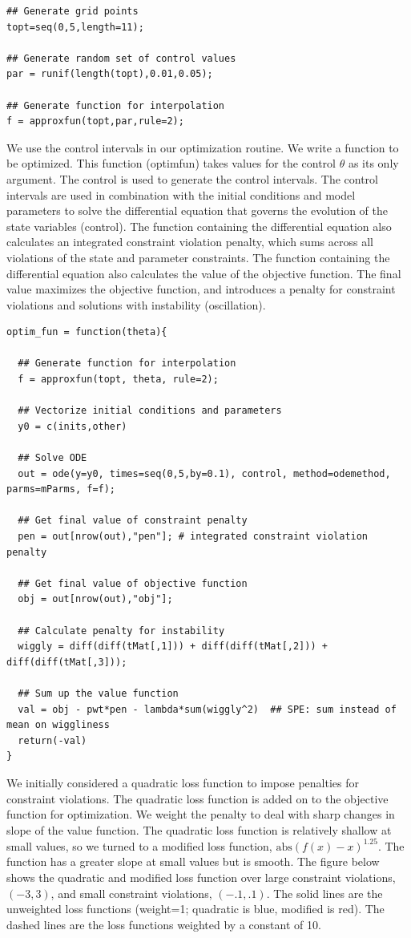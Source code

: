 \documentclass[12pt, oneside]{article}   	%
\begin{document}
\begin{lstlisting}
## Generate grid points
topt=seq(0,5,length=11); 

## Generate random set of control values
par = runif(length(topt),0.01,0.05); 

## Generate function for interpolation
f = approxfun(topt,par,rule=2);
\end{lstlisting}

We use the control intervals in our optimization routine. We write a function to be optimized. This function (optimfun) takes values for the control $\theta$ as its only argument. The control is used to generate the control intervals. The control intervals are used in combination with the initial conditions and model parameters to solve the differential equation that governs the evolution of the state variables (control). The function containing the differential equation also calculates an integrated constraint violation penalty, which sums across all violations of the state and parameter constraints. The function containing the differential equation also calculates the value of the objective function. The final value maximizes the objective function, and introduces a penalty for constraint violations and solutions with instability (oscillation).

\begin{lstlisting}
optim_fun = function(theta){
  
  ## Generate function for interpolation
  f = approxfun(topt, theta, rule=2);
  
  ## Vectorize initial conditions and parameters
  y0 = c(inits,other) 
  
  ## Solve ODE
  out = ode(y=y0, times=seq(0,5,by=0.1), control, method=odemethod, parms=mParms, f=f);
  
  ## Get final value of constraint penalty
  pen = out[nrow(out),"pen"]; # integrated constraint violation penalty 
  
  ## Get final value of objective function
  obj = out[nrow(out),"obj"]; 
  
  ## Calculate penalty for instability
  wiggly = diff(diff(tMat[,1])) + diff(diff(tMat[,2])) + diff(diff(tMat[,3])); 
  
  ## Sum up the value function
  val = obj - pwt*pen - lambda*sum(wiggly^2)  ## SPE: sum instead of mean on wiggliness
  return(-val)
}
\end{lstlisting}

We initially considered a quadratic loss function to impose penalties for constraint violations. The quadratic loss function is added on to the objective function for optimization. We weight the penalty to deal with sharp changes in slope of the value function. The quadratic loss function is relatively shallow at small values, so we turned to a modified loss function, $\mathrm{abs}( f(x) - x )^{1.25} $. The function has a greater slope at small values but is smooth. The figure below shows the quadratic and modified loss function over large constraint violations, $(-3,3)$, and small constraint violations, $(-.1,.1)$. The solid lines are the unweighted loss functions (weight=1; quadratic is blue, modified is red). The dashed lines are the loss functions weighted by a constant of 10. 
\end{document}
